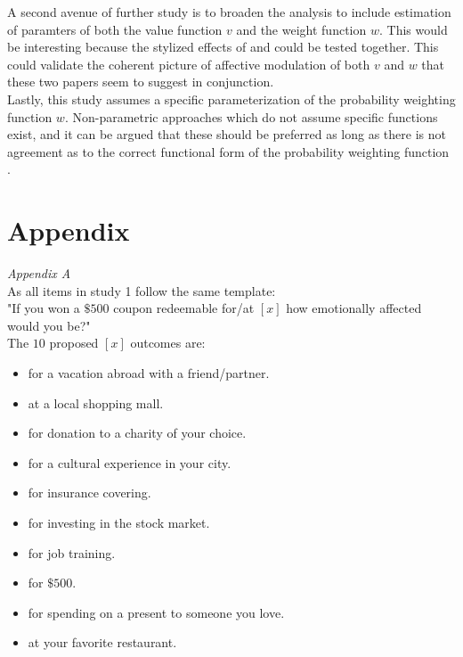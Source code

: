 \documentclass[12pt]{article}
\begin{document}
A second avenue of further study is to broaden
the analysis to include estimation of paramters
of both the value function $v$ and the weight
function  $w$. This would be interesting because
the stylized effects of \textcite{
rottenstreich2001money} and \textcite{hsee2004music}
could be tested together. This could validate
the coherent picture of affective modulation
of both $v$ and  $w$ that
these two papers seem to suggest in
conjunction. \\

Lastly, this study assumes
a specific parameterization of
the probability weighting function $w$.
Non-parametric approaches which do not assume
specific functions exist, and it can
be argued that these should be preferred
as long as there is not agreement as to
the correct functional form of the
probability weighting function
\autocite{wu1996curvature}.

\printbibliography
\section{Appendix}

\emph{Appendix A} \\
As all items in study 1 follow the same template: \\

"If you won a $\$500$ coupon redeemable for/at
$[x]$ how emotionally affected would you be?" \\

The $10$ proposed $[x]$ outcomes are:
\begin{itemize}
	\item for a vacation abroad with a friend/partner.
	\item at a local shopping mall.
	\item for donation to a charity of your choice.
	\item for a cultural experience in your city.
	\item for insurance covering.
	\item for investing in the stock market.
	\item for job training.
	\item for $\$500$.
	\item for spending on a present to someone you love.
	\item at your favorite restaurant.
\end{itemize}
\end{document}
